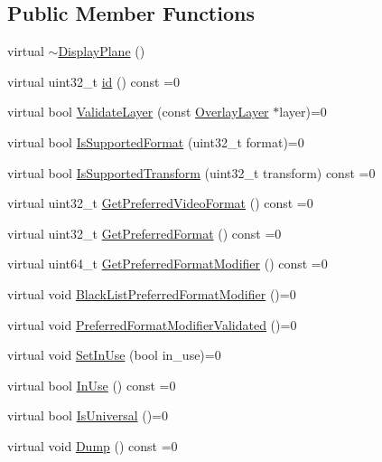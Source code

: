 \subsection*{Public Member Functions}
\begin{DoxyCompactItemize}
\item 
virtual \mbox{\hyperlink{classhwcomposer_1_1DisplayPlane_aff38293d2f39ff6d298aa1a50f14409c}{$\sim$\+Display\+Plane}} ()
\item 
virtual uint32\+\_\+t \mbox{\hyperlink{classhwcomposer_1_1DisplayPlane_a0af461a6ac4beccb8ed21aec933b6eed}{id}} () const =0
\item 
virtual bool \mbox{\hyperlink{classhwcomposer_1_1DisplayPlane_a138f43531c6320ad6622ea48ab86df13}{Validate\+Layer}} (const \mbox{\hyperlink{structhwcomposer_1_1OverlayLayer}{Overlay\+Layer}} $\ast$layer)=0
\item 
virtual bool \mbox{\hyperlink{classhwcomposer_1_1DisplayPlane_a057c78a4a3657a04c5117ee0f1dba8be}{Is\+Supported\+Format}} (uint32\+\_\+t format)=0
\item 
virtual bool \mbox{\hyperlink{classhwcomposer_1_1DisplayPlane_ade9032b0c8991b0e79d321e946c8f625}{Is\+Supported\+Transform}} (uint32\+\_\+t transform) const =0
\item 
virtual uint32\+\_\+t \mbox{\hyperlink{classhwcomposer_1_1DisplayPlane_aab8aae5944b1107e4efc9d0d79c43c40}{Get\+Preferred\+Video\+Format}} () const =0
\item 
virtual uint32\+\_\+t \mbox{\hyperlink{classhwcomposer_1_1DisplayPlane_a963d17ec10be62d13f35a0b4ced4e8e1}{Get\+Preferred\+Format}} () const =0
\item 
virtual uint64\+\_\+t \mbox{\hyperlink{classhwcomposer_1_1DisplayPlane_ad95d2bd823ccf74fe3deccad7352f672}{Get\+Preferred\+Format\+Modifier}} () const =0
\item 
virtual void \mbox{\hyperlink{classhwcomposer_1_1DisplayPlane_a397270389f37f6c706a639be5225e62e}{Black\+List\+Preferred\+Format\+Modifier}} ()=0
\item 
virtual void \mbox{\hyperlink{classhwcomposer_1_1DisplayPlane_a8d2d4175bec7646f1f4216d3488bb2f6}{Preferred\+Format\+Modifier\+Validated}} ()=0
\item 
virtual void \mbox{\hyperlink{classhwcomposer_1_1DisplayPlane_a6f74f9f29977ae00d534f2488505d7d7}{Set\+In\+Use}} (bool in\+\_\+use)=0
\item 
virtual bool \mbox{\hyperlink{classhwcomposer_1_1DisplayPlane_a8461ec31b18379cc371cd0656ca0e615}{In\+Use}} () const =0
\item 
virtual bool \mbox{\hyperlink{classhwcomposer_1_1DisplayPlane_a7b374ba9e799f7d0b53afbd939961c51}{Is\+Universal}} ()=0
\item 
virtual void \mbox{\hyperlink{classhwcomposer_1_1DisplayPlane_a3754165ab1101fba4229b842c7f14556}{Dump}} () const =0
\end{DoxyCompactItemize}


